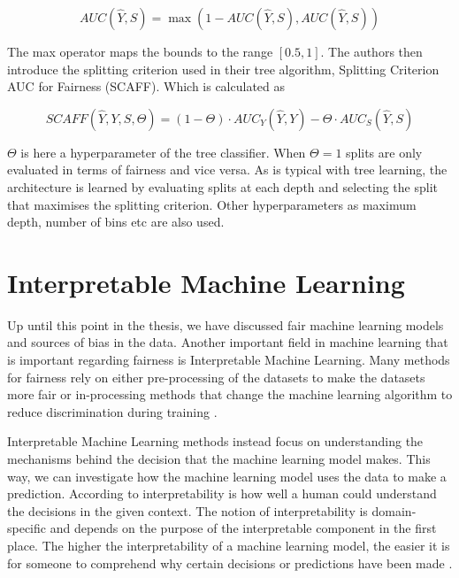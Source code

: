 \begin{equation}
    AUC(\hat{Y}, S) = \max(1 - AUC(\hat{Y}, S), AUC(\hat{Y}, S))
\end{equation}

The max operator maps the bounds to the range $[0.5, 1]$. The authors then introduce the splitting criterion used in their tree algorithm, Splitting Criterion AUC for Fairness (SCAFF). Which is calculated as

\begin{equation*}
    SCAFF(\hat{Y}, Y, S, \Theta) = (1 - \Theta) \cdot AUC_Y(\hat{Y}, Y) - \Theta \cdot AUC_S(\hat{Y}, S)
\end{equation*}

$\Theta$ is here a hyperparameter of the tree classifier. When $\Theta = 1$ splits are only evaluated in terms of fairness and vice versa.  As is typical with tree learning, the architecture is learned by evaluating splits at each depth and selecting the split that maximises the splitting criterion. Other hyperparameters as maximum depth, number of bins etc are also used.

\section{Interpretable Machine Learning}

Up until this point in the thesis, we have discussed fair machine learning models and sources of bias in the data. Another important field in machine learning that is important regarding fairness is Interpretable Machine Learning. Many methods for fairness rely on either pre-processing of the datasets to make the datasets more fair or in-processing methods that change the machine learning algorithm to reduce discrimination during training \cite{Mehrabi:2021:CSUR}.

Interpretable Machine Learning methods instead focus on understanding the mechanisms behind the decision that the machine learning model makes. This way, we can investigate how the machine learning model uses the data to make a prediction. According to \citet{Miller:2019:AIJ} interpretability is how well a human could understand the decisions in the given context. The notion of interpretability is domain-specific and depends on the purpose of the interpretable component in the first place. The higher the interpretability of a machine learning model, the easier it is for someone to comprehend why certain decisions or predictions have been made \cite{Molnar:2020:Book}.

